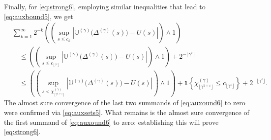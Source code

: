 \documentclass[11pt,leqno]{amsart}
\numberwithin{table}{section}
\numberwithin{figure}{section}
\numberwithin{equation}{section}
\newcommand{\1}{{\mathds{1}}}
\newcommand{\0}{\mat{0}}
\begin{document}
{Finally, for \eqref{eq:strong6}, employing similar inequalities that lead to \eqref{eq:auxbound5}, we get
\begin{align}
&\sum_{k=1}^{\infty}2^{-k}\left(\left(\sup_{s\le c_k}\left|\mathbb{U}^{(\gamma)}\big(\Delta^{(\gamma)}(s)\big)- U(s)\right|\right)\wedge 1\right)\nonumber\\
& \quad\le \left(\left(\sup_{s\le c_{\lfloor \gamma^{\varepsilon}\rfloor}}\left|\mathbb{U}^{(\gamma)}\big(\Delta^{(\gamma)}(s)\big)- U(s)\right|\right)\wedge 1\right) + 2^{-\lfloor \gamma^{\varepsilon}\rfloor}\nonumber\\
& \quad\le \left(\left(\sup_{s < \chi^{(\gamma)}_{\lfloor \gamma^{1+\varepsilon}\rfloor}}\left|\mathbb{U}^{(\gamma)}\big(\Delta^{(\gamma)}(s)\big)- U(s)\right|\right)\wedge 1\right) + \mathds{1} \left\{\chi^{(\gamma)}_{\lfloor \gamma^{1+\varepsilon}\rfloor} \le c_{\lfloor \gamma^{\varepsilon}\rfloor}\right\} + 2^{-\lfloor \gamma^{\varepsilon}\rfloor}.\label{eq:auxound6}
\end{align}
The almost sure convergence of the last two summands of \eqref{eq:auxound6} to zero were confirmed via \eqref{eq:auxsets5}. What remains is the almost sure convergence of the first summand of \eqref{eq:auxound6} to zero: establishing this will prove \eqref{eq:strong6}. 

}
\end{document}
